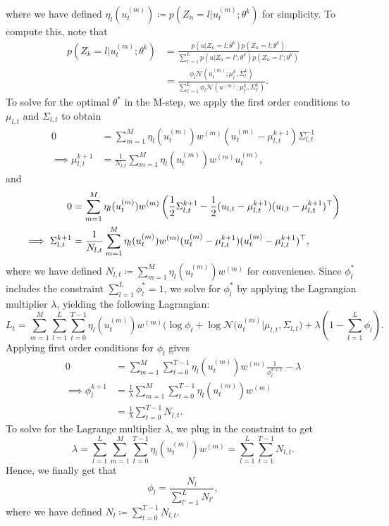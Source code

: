 \documentclass[twoside,11pt]{article}
\begin{document}
where we have defined $\eta_l(u_t^{(m)}) \coloneqq p(Z_n = l | u_t^{(m)}; \theta^{k})$ for simplicity.
To compute this, note that
\begin{align}
    p(Z_k = l| u_t^{(m)}; \theta^k)
    &= \frac{p(u | Z_n = l; \theta^k) p(Z_n = l; \theta^{k})}{\sum_{l'=1}^L p(u | Z_n = l'; \theta^{k}) p(Z_n = l'; \theta^{k})} \\
    &= \frac{ \phi_l \mathcal{N}(u_t^{(m)}; \mu_l^{k}, \Sigma_l^{k}) }{\sum_{l'=1}^L \phi_l \mathcal{N}(u^{(m)}; \mu_{l'}^{k}, \Sigma_{l'}^{k}) } .
\end{align}
To solve for the optimal $\theta^*$ in the M-step, we apply the first order conditions to $\mu_{l, t}$ and $\Sigma_{l, t}$ to obtain
\begin{align}
    0 &= \sum_{m=1}^M \eta_l(u_t^{(m)}) w^{(m)} (u_t^{(m)} - \mu_{l, t}^{k+1}) \Sigma_{l, t}^{-1} \\
    \implies \mu_{l, t}^{k+1} &= \frac{1}{N_{l, t}} \sum_{m=1}^M \eta_l(u_t^{(m)}) w^{(m)} u_t^{(m)},
\end{align}
and
\begin{align}
    0 &= \sum_{m=1}^M \eta_l(u_t^{(m)}) w^{(m)} \left( \frac{1}{2} \Sigma_{l, t}^{k+1} - \frac{1}{2} (u_{l, t} - \mu_{l, t}^{k+1})(u_{l, t} - \mu_{l, t}^{k+1} )^\top \right) \\
    \implies \Sigma_{l, t}^{k+1} &= \frac{1}{N_{l, t}} \sum_{m=1}^M \eta_l(u_t^{(m)}) w^{(m)} (u_t^{(m)} - \mu_{l, t}^{k+1}) (u_t^{(m)} - \mu_{l, t}^{k+1})^\top , 
\end{align}
where we have defined $N_{l, t} \coloneqq \sum_{m=1}^M \eta_l(u_t^{(m)}) w^{(m)}$ for convenience.
Since $\phi_l^*$ includes the constraint $\sum_{l=1}^L \phi_l^* = 1$, we solve for $\phi_l^*$ by applying the Lagrangian multiplier $\lambda$, yielding the following Lagrangian:
\begin{equation}
    L_t =
    \sum_{m=1}^M \sum_{l=1}^L \sum_{t=0}^{T-1} \eta_l(u_t^{(m)}) w^{(m)} \big( \log \phi_l + \log \mathcal{N}(u_t^{(m)} | \mu_{l, t}, \Sigma_{l, t} \big) + \lambda \left(1 - \sum_{l=1}^L \phi_l \right) .
\end{equation}
Applying first order conditions for $\phi_l$ gives
\begin{align}
    0 &= \sum_{m=1}^M \sum_{t=0}^{T-1} \eta_l(u_t^{(m)}) w^{(m)} \frac{1}{\phi_l^{k+1}} - \lambda \\
    \implies \phi_l^{k+1} &= \frac{1}{\lambda} \sum_{m=1}^M \sum_{t=0}^{T-1} \eta_l(u_t^{(m)}) w^{(m)} \\
                   &= \frac{1}{\lambda} \sum_{t=0}^{T-1} N_{l, t} .
\end{align}
To solve for the Lagrange multiplier $\lambda$, we plug in the constraint to get
\begin{equation}
    \lambda = \sum_{l=1}^L \sum_{m=1}^M \sum_{t=0}^{T-1} \eta_l(u_t^{(m)}) w^{(m)} = \sum_{l=1}^L \sum_{t=1}^{T-1} N_{l, t} .
\end{equation}
Hence, we finally get that 
\begin{equation}
    \phi_l = \frac{N_l}{\sum_{l'=1}^L N_{l'}},
\end{equation}
where we have defined $N_l \coloneqq \sum_{t=0}^{T-1} N_{l, t}$.
\end{document}
